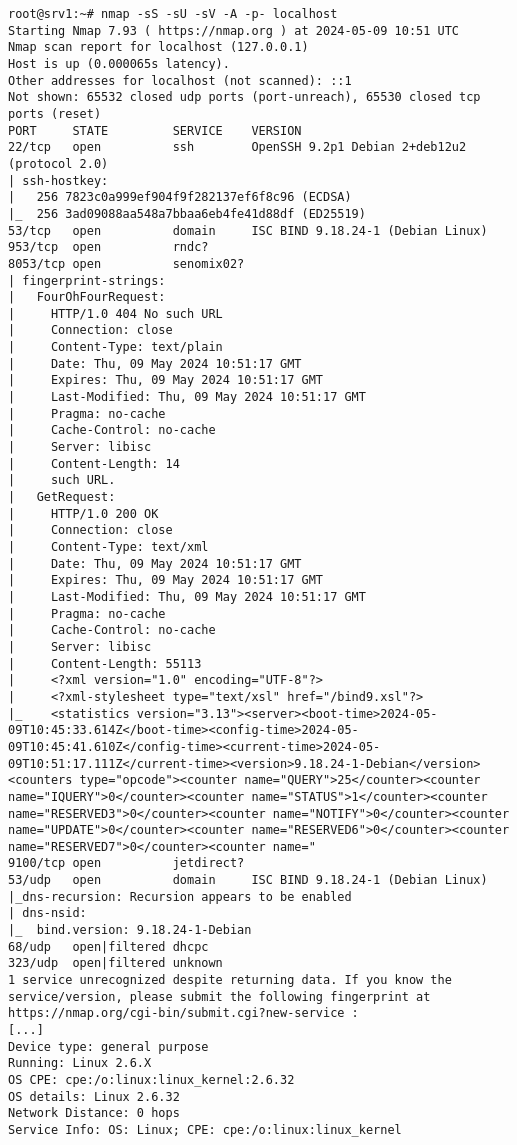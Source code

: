 \begin{longlisting}
  \begin{verbatim}
root@srv1:~# nmap -sS -sU -sV -A -p- localhost
Starting Nmap 7.93 ( https://nmap.org ) at 2024-05-09 10:51 UTC
Nmap scan report for localhost (127.0.0.1)
Host is up (0.000065s latency).
Other addresses for localhost (not scanned): ::1
Not shown: 65532 closed udp ports (port-unreach), 65530 closed tcp ports (reset)
PORT     STATE         SERVICE    VERSION
22/tcp   open          ssh        OpenSSH 9.2p1 Debian 2+deb12u2 (protocol 2.0)
| ssh-hostkey:
|   256 7823c0a999ef904f9f282137ef6f8c96 (ECDSA)
|_  256 3ad09088aa548a7bbaa6eb4fe41d88df (ED25519)
53/tcp   open          domain     ISC BIND 9.18.24-1 (Debian Linux)
953/tcp  open          rndc?
8053/tcp open          senomix02?
| fingerprint-strings:
|   FourOhFourRequest:
|     HTTP/1.0 404 No such URL
|     Connection: close
|     Content-Type: text/plain
|     Date: Thu, 09 May 2024 10:51:17 GMT
|     Expires: Thu, 09 May 2024 10:51:17 GMT
|     Last-Modified: Thu, 09 May 2024 10:51:17 GMT
|     Pragma: no-cache
|     Cache-Control: no-cache
|     Server: libisc
|     Content-Length: 14
|     such URL.
|   GetRequest:
|     HTTP/1.0 200 OK
|     Connection: close
|     Content-Type: text/xml
|     Date: Thu, 09 May 2024 10:51:17 GMT
|     Expires: Thu, 09 May 2024 10:51:17 GMT
|     Last-Modified: Thu, 09 May 2024 10:51:17 GMT
|     Pragma: no-cache
|     Cache-Control: no-cache
|     Server: libisc
|     Content-Length: 55113
|     <?xml version="1.0" encoding="UTF-8"?>
|     <?xml-stylesheet type="text/xsl" href="/bind9.xsl"?>
|_    <statistics version="3.13"><server><boot-time>2024-05-09T10:45:33.614Z</boot-time><config-time>2024-05-09T10:45:41.610Z</config-time><current-time>2024-05-09T10:51:17.111Z</current-time><version>9.18.24-1-Debian</version><counters type="opcode"><counter name="QUERY">25</counter><counter name="IQUERY">0</counter><counter name="STATUS">1</counter><counter name="RESERVED3">0</counter><counter name="NOTIFY">0</counter><counter name="UPDATE">0</counter><counter name="RESERVED6">0</counter><counter name="RESERVED7">0</counter><counter name="
9100/tcp open          jetdirect?
53/udp   open          domain     ISC BIND 9.18.24-1 (Debian Linux)
|_dns-recursion: Recursion appears to be enabled
| dns-nsid:
|_  bind.version: 9.18.24-1-Debian
68/udp   open|filtered dhcpc
323/udp  open|filtered unknown
1 service unrecognized despite returning data. If you know the service/version, please submit the following fingerprint at https://nmap.org/cgi-bin/submit.cgi?new-service :
[...]
Device type: general purpose
Running: Linux 2.6.X
OS CPE: cpe:/o:linux:linux_kernel:2.6.32
OS details: Linux 2.6.32
Network Distance: 0 hops
Service Info: OS: Linux; CPE: cpe:/o:linux:linux_kernel


\end{verbatim}
\end{longlisting}
